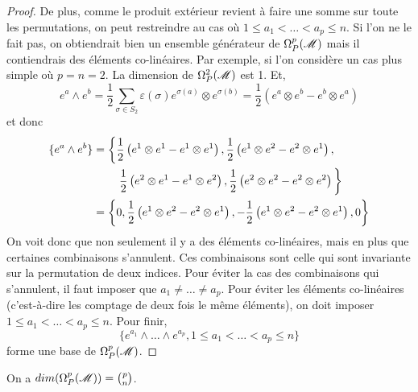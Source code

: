 \documentclass[a4paper,11pt]{report}
\begin{document}
\begin{proof}
                De plus, comme le produit extérieur revient à faire une somme sur toute les permutations, on peut restreindre au cas où $1\leq a_1<\dots<a_p\leq n$. Si l'on ne le fait pas, on obtiendrait bien un ensemble générateur de $\Omega_P^p(\mathscr{M})$ mais il contiendrais des éléments co-linéaires. Par exemple, si l'on considère un cas plus simple où $p=n=2$. La dimension de $\Omega_P^2(\mathscr{M})$ est 1. Et,
                \begin{equation}
                    e^a\wedge e^b = \frac{1}{2}\sum_{\sigma\in S_2} \varepsilon(\sigma)e^{\sigma(a)}\otimes e^{\sigma(b)} = \frac{1}{2}\left( e^a\otimes e^b - e^b\otimes e^a \right)
                \end{equation}
                et donc
                \begin{align}
                    \{e^a\wedge e^b\} &= \bigg\{ 
                    \frac{1}{2}\left( e^1\otimes e^1 - e^1\otimes e^1 \right), \frac{1}{2}\left( e^1\otimes e^2 - e^2\otimes e^1 \right),\\
                    &\hspace{0.825cm}\frac{1}{2}\left( e^2\otimes e^1 - e^1\otimes e^2 \right),\frac{1}{2}\left( e^2\otimes e^2 - e^2\otimes e^2 \right) \bigg\} \\
                    &= \left\{ 
                    0, \frac{1}{2}\left( e^1\otimes e^2 - e^2\otimes e^1 \right),-\frac{1}{2}\left( e^1\otimes e^2 - e^2\otimes e^1 \right),0 \right\}
                \end{align}
                On voit donc que non seulement il y a des éléments co-linéaires, mais en plus que certaines combinaisons s'annulent. Ces combinaisons sont celle qui sont invariante sur la permutation de deux indices. Pour éviter la cas des combinaisons qui s'annulent, il faut imposer que $a_1\neq \dots\neq a_p$. Pour éviter les éléments co-linéaires (c'est-à-dire les comptage de deux fois le même éléments), on doit imposer $1\leq a_1<\dots<a_p\leq n$. Pour finir,
                \begin{equation}
                    \{e^{a_1}\wedge\dots \wedge e^{a_p},1\leq a_1<\dots<a_p\leq n\}
                \end{equation}
                forme une base de $\Omega_P^p(\mathscr{M})$.
            \end{proof}
            
            \begin{prop}\begin{leftbar}
                On a $dim(\Omega_P^p(\mathscr{M})) = {p \choose n}$.
            \end{leftbar}\end{prop}
            
\end{document}
